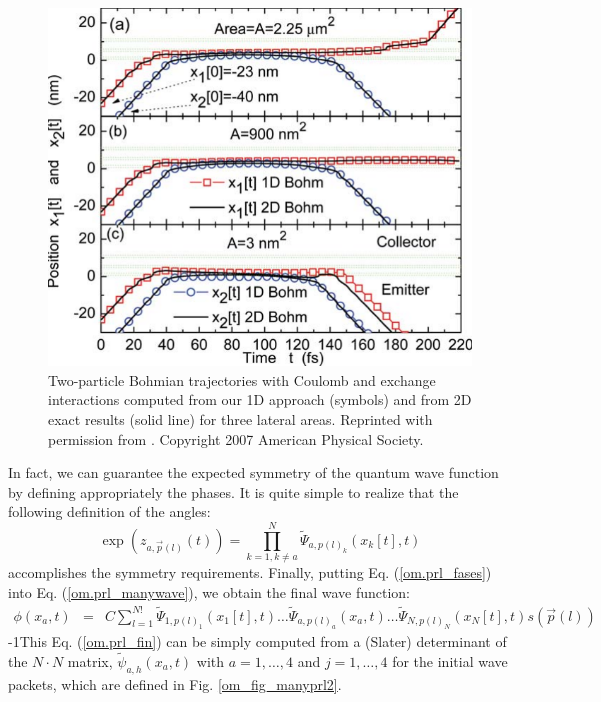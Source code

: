 \documentclass[onecolumn,nofootinbib, secnumarabic, amsmath, nobibnotes,11pt,aps,pra]{revtex4-1}
\newcommand{\fref}[1]{Fig. \ref{#1}}
\newcommand{\eref}[1]{Eq. (\ref{#1})}
\begin{document}
\begin{figure}
\includegraphics{ch1-07.pdf}
\caption{Two-particle Bohmian trajectories with Coulomb and exchange interactions computed from our 1D approach (symbols) and from 2D exact results (solid line) for three lateral areas. Reprinted with permission from \cite{om.oriolsprl}. Copyright 2007 American Physical Society.}
\label{om_fig_prl2}
\end{figure}

In fact, we can guarantee the expected symmetry of the quantum wave
function by defining appropriately the phases. It is quite simple
to realize that the following definition of the angles:
\begin{equation}
\label{om.prl_fases}
 \exp { (z_{a,\vec{p}(l)}(t)) } = \prod^{N}_{k = 1,k\neq a} \tilde \Psi_{a,p(l)_k}(x_k[t],t)
\end{equation}
 accomplishes the symmetry requirements. Finally, putting \eref{om.prl_fases} into \eref{om.prl_manywave}, we obtain the final wave function:
\begin{eqnarray}
\phi(x_a,t) &=& C \sum\limits_{l = 1}^{N!}{{{\tilde{\Psi }}}_{1,
p{{(l)}}_1}}({{x}_{1}}[t],t)\ldots {{{\tilde{\Psi }}}_{a, p{{(l)}}_a}}({{x}_{a}},t)\ldots{{{\tilde{\Psi }}}_{N, p{{(l)}}_N}}{({{x}_{N}}[t],t) s(\vec{p}(l))}
 \label{om.prl_fin}
 \end{eqnarray}
\looseness-1This Eq. (\ref{om.prl_fin}) can be simply computed from a (Slater) determinant of the $N \cdot N$ matrix, $\tilde{\psi}_{a,h}(x_a,t)$ with $a = 1, \ldots , 4$ and $j = 1, \ldots , 4$ for the initial wave packets, which are defined in \fref{om_fig_manyprl2}.
\end{document}
